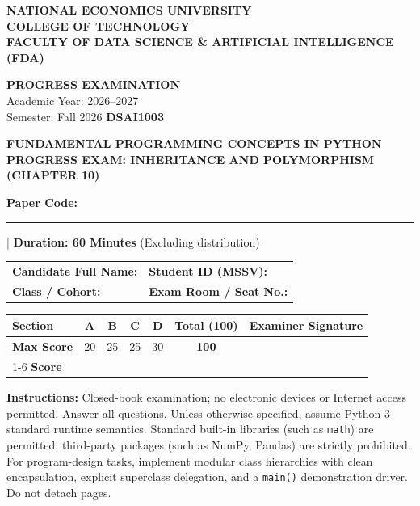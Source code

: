 \documentclass[11pt,a4paper]{article}
\begin{document}
\noindent
\begin{minipage}[t]{0.63\textwidth}\raggedright\small
\textbf{NATIONAL ECONOMICS UNIVERSITY}\\
\textbf{COLLEGE OF TECHNOLOGY}\\
\textbf{FACULTY OF DATA SCIENCE \& ARTIFICIAL INTELLIGENCE (FDA)}
\end{minipage}\hfill
\begin{minipage}[t]{0.35\textwidth}\raggedleft\footnotesize
\textbf{PROGRESS EXAMINATION}\\
Academic Year: 2026--2027\\
Semester: Fall 2026 \quad \textbf{DSAI1003}
\end{minipage}
\vspace{0.1em}
\begin{center}
{\Large\bfseries\color{primaryblue} FUNDAMENTAL PROGRAMMING CONCEPTS IN PYTHON}\\[0.05em]
{\normalsize\bfseries PROGRESS EXAM: INHERITANCE AND POLYMORPHISM (CHAPTER 10)}\\[0.05em]
{\normalsize\textbf{Paper Code:} \rule{1.5cm}{0.4pt} \quad | \quad \textbf{Duration: 60 Minutes} (Excluding distribution)}
\end{center}
\begin{headerbox}
\begin{tabularx}{\linewidth}{@{}X X@{}}
\textbf{Candidate Full Name:} \dotfill & \textbf{Student ID (MSSV):} \dotfill \\[0.15em]
\textbf{Class / Cohort:} \dotfill & \textbf{Exam Room / Seat No.:} \dotfill
\end{tabularx}
\vspace{1.5mm}
\centering\setlength{\tabcolsep}{4pt}\renewcommand{\arraystretch}{1.05}
\begin{tabular}{|l|c|c|c|c||c|c|}\hline
\textbf{Section} & \textbf{A} & \textbf{B} & \textbf{C} & \textbf{D} & \textbf{Total (100)} & \textbf{Examiner Signature} \\ \hline
\textbf{Max Score} & 20 & 25 & 25 & 30 & \textbf{100} & \\[0.2em] \cline{1-6}
\textbf{Score} & & & & & & \\[0.35em] \hline
\end{tabular}
\vspace{1mm}\raggedright\scriptsize
\textbf{Instructions:} Closed-book examination; no electronic devices or Internet access permitted. Answer all questions. Unless otherwise specified, assume Python 3 standard runtime semantics. Standard built-in libraries (such as \texttt{math}) are permitted; third-party packages (such as NumPy, Pandas) are strictly prohibited. For program-design tasks, implement modular class hierarchies with clean encapsulation, explicit superclass delegation, and a \texttt{main()} demonstration driver. Do not detach pages.
\end{headerbox}
\end{document}
